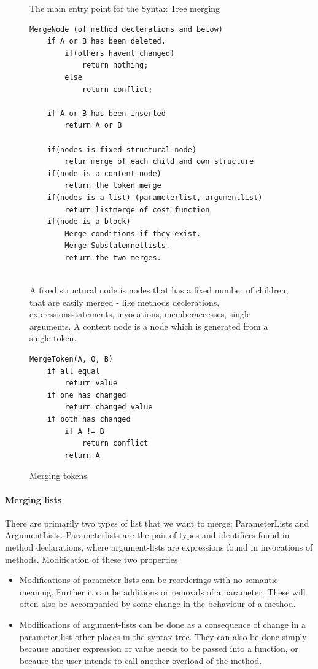 \documentclass[11pt]{article}
\begin{document}
\begin{figure}
  \caption{The main entry point for the Syntax Tree merging}
  \label{MergeNode}
\begin{verbatim}
MergeNode (of method declerations and below)
    if A or B has been deleted.
        if(others havent changed)
            return nothing;
        else
            return conflict;
            
    if A or B has been inserted
        return A or B
        
    if(nodes is fixed structural node)
        retur merge of each child and own structure
    if(node is a content-node) 
        return the token merge
    if(nodes is a list) (parameterlist, argumentlist)
        return listmerge of cost function
    if(node is a block)
        Merge conditions if they exist.
        Merge Substatemnetlists.
        return the two merges.
        

\end{verbatim}
\caption{A fixed structural node is nodes that has a fixed number of children, that are easily merged - like methods declerations, expressionsstatements, invocations, memberaccesses, single arguments. A content node is a node which is generated from a single token.}
\end{figure}


\begin{figure}
  \caption{Merging tokens}
  \label{MergeToken}
\begin{verbatim}
MergeToken(A, O, B)
    if all equal
        return value
    if one has changed
        return changed value
    if both has changed 
        if A != B
            return conflict
        return A
\end{verbatim}
\end{figure}

\paragraph{Merging lists}
There are primarily two types of list that we want to merge: ParameterLists and ArgumentLists. Parameterlists are the pair of types and identifiers found in method declarations, where argument-lists are expressions found in invocations of methods. Modification of these two properties 

\begin{itemize}
	\item Modifications of parameter-lists can be reorderings with no semantic meaning. Further it can be additions or removals of a parameter. These will often also be accompanied by some change in the behaviour of a method.
	\item Modifications of argument-lists can be done as a consequence of change in a parameter list other places in the syntax-tree. They can also be done simply because another expression or value needs to be passed into a function, or because the user intends to call another overload of the method.
\end{itemize}
\end{document}
